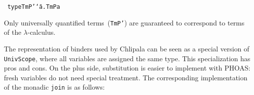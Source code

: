 \documentclass[9pt,preprint,authoryear]{sigplanconf}
\begin{document}
{{{}\vphantom{$\{$}}}\textcolor[rgb]{0,0,0.80}{\texttt{{\nopagebreak \newline%
}\vphantom{$\{$}}}\textcolor[cmyk]{0,0.65,0.99,0}{\texttt{type}}\textcolor[rgb]{0,0,0.80}{\texttt{\mbox{\hspace{0.50em}}}}\textcolor[rgb]{0,0,0.80}{\texttt{TmP{'}}}\textcolor[rgb]{0,0,0.80}{\texttt{\mbox{\hspace{0.50em}}}}\textcolor[cmyk]{0,0.65,0.99,0}{\texttt{{\char `\=}}}\textcolor[rgb]{0,0,0.80}{\texttt{\mbox{\hspace{0.50em}}}}\textcolor[cmyk]{0,0.65,0.99,0}{\texttt{\makebox[1.22ex][c]{$ \forall $}}}\textcolor[rgb]{0,0,0.80}{\texttt{\mbox{\hspace{0.50em}}}}\textcolor[rgb]{0,0,0.80}{\texttt{a}}\textcolor[cmyk]{0,0.65,0.99,0}{\texttt{.}}\textcolor[rgb]{0,0,0.80}{\texttt{\mbox{\hspace{0.50em}}}}\textcolor[rgb]{0,0,0.80}{\texttt{TmP}}\textcolor[rgb]{0,0,0.80}{\texttt{\mbox{\hspace{0.50em}}}}\textcolor[rgb]{0,0,0.80}{\texttt{a}}\textcolor[rgb]{0,0,0.80}{\texttt{{\nopagebreak \newline%
}\vphantom{$\{$}}}%


%
Only universally quantified terms{~}(\textcolor[rgb]{0,0,0.80}{\texttt{TmP{'}}}) are
    guaranteed to correspond to terms of the $ \lambda $-calculus.%


%
The representation of binders used by Chlipala can be seen as a
    special version of \textcolor[rgb]{0,0,0.80}{\texttt{UnivScope}}, where all variables are assigned
    the same type. This specialization has pros and cons. On the plus
    side, substitution is easier to implement with PHOAS{:} fresh variables 
    do not need special treatment. The corresponding implementation
    of the monadic \textcolor[rgb]{0,0,0.80}{\texttt{join}} is as follows{:}%


{\nopagebreak }
\end{document}
